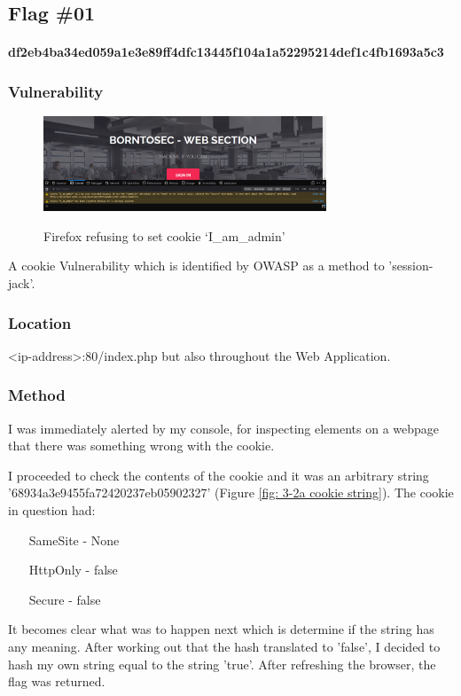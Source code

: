 \subsection{Flag \#01}
\paragraph{df2eb4ba34ed059a1e3e89ff4dfc13445f104a1a52295214def1c4fb1693a5c3}
\subsubsection{Vulnerability}
\begin{figure}[!htb]
    \centering
    \includegraphics[width=0.752\textwidth]{3.cookies/01-01.png}\\[0cm]  
    \caption[Cookie Alert]{Firefox refusing to set cookie `I\_am\_admin'}
    \label{fig:03-01 - Firefox rejects cookie iamadmin} 
\end{figure}
A cookie Vulnerability which is identified by OWASP as a
method to 'session-jack'\cite{OWASP}.

\subsubsection{Location}
<ip-address>:80/index.php but also throughout the Web Application.

\subsubsection{Method}

I was immediately alerted by my console, for inspecting elements on
a webpage that there was something wrong with the cookie.

I proceeded to check the contents of the cookie and it was
an arbitrary string '68934a3e9455fa72420237eb05902327' (Figure \vref{fig: 3-2a cookie string}). The
cookie in question had:
\begin{itemize}
    \item[SameSite] - None
    \item[HttpOnly] - false
    \item[Secure] - false
\end{itemize}
It becomes clear what was to happen next which is determine if the string
has any meaning. After working out that the hash translated to 'false', I
decided to hash my own string equal to the string 'true'.
After refreshing the browser, the flag was returned.

